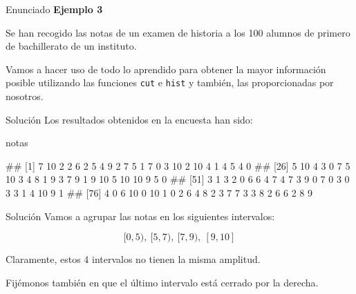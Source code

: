 \documentclass[
  ignorenonframetext,
  aspectratio=169]{beamer}
\newenvironment{Shaded}{\begin{snugshade}}{\end{snugshade}}
\newcommand{\NormalTok}[1]{#1}
\let\oldverbatim\verbatim
\let\endoldverbatim\endverbatim
\renewenvironment{verbatim}{\tiny\oldverbatim}{\endoldverbatim}
\begin{document}
\begin{frame}[fragile]{Enunciado}
\protect\hypertarget{enunciado-1}{}
\textbf{Ejemplo 3}

Se han recogido las notas de un examen de historia a los 100 alumnos de
primero de bachillerato de un instituto.

Vamos a hacer uso de todo lo aprendido para obtener la mayor información
posible utilizando las funciones \texttt{cut} e \texttt{hist} y también,
las proporcionadas por nosotros.
\end{frame}

\begin{frame}[fragile]{Solución}
\protect\hypertarget{soluciuxf3n-15}{}
Los resultados obtenidos en la encuesta han sido:

\begin{Shaded}
\begin{Highlighting}[]
\NormalTok{notas}
\end{Highlighting}
\end{Shaded}

\begin{verbatim}
##   [1]  7 10  2  2  6  2  5  4  9  2  7  5  1  7  0  3 10  2 10  4  1  4  5  4  0
##  [26]  5 10  4  3  0  7  5 10  3  4  8  1  9  3  7  9  1  9 10  5 10 10  9  5  0
##  [51]  3  1  3  2  0  6  6  4  7  4  7  3  9  0  7  0  3  0  3  3  1  4 10  9  1
##  [76]  4  0  6 10  0 10  1  0  2  6  4  8  2  3  7  7  3  3  8  2  6  6  2  8  9
\end{verbatim}
\end{frame}

\begin{frame}{Solución}
\protect\hypertarget{soluciuxf3n-16}{}
Vamos a agrupar las notas en los siguientes intervalos:

\[[0,5),\ [5,7),\ [7,9),\ [9,10]\]

Claramente, estos 4 intervalos no tienen la misma amplitud.

Fijémonos también en que el último intervalo está cerrado por la
derecha.
\end{frame}
\end{document}
